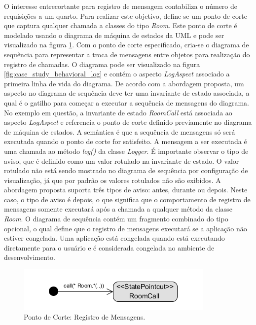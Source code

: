 O interesse entrecortante para registro de mensagem contabiliza o número de requisições a um quarto. Para realizar este objetivo, define-se um ponto
de corte que captura qualquer chamada a classes do tipo \textit{Room}. Este ponto de corte é modelado usando o diagrama de máquina de estados da UML e 
pode ser visualizado na figura \ref{fig:case_study_behavioral_pointcut_log}. Com o ponto de corte especificado, cria-se o diagrama de sequência para
representar a troca de mensagens entre objetos para realização do registro de chamadas. O diagrama pode ser visualizado 
na figura \ref{fig:case_study_behavioral_log} e contém o aspecto \textit{LogAspect} associado a primeira linha de vida do diagrama. De acordo com a
abordagem proposta, um aspecto no diagrama de sequência deve ter uma invariante de estado associada, a qual é o gatilho 
para começar a executar a sequência de mensagens do diagrama. No exemplo em questão, a invariante de estado \textit{RoomCall} está associada ao
aspecto \textit{LogAspect} e referencia o ponto de corte definido previamente no diagrama de máquina de estados. A semântica é que 
a sequência de mensagens só será executada quando o ponto de corte for satisfeito. A mensagem a ser executada
é uma chamada ao método \textit{log()} da classe \textit{Logger}. É importante observar o tipo de aviso, que é definido como um valor rotulado na
invariante de estado. O valor rotulado não está sendo mostrado no diagrama de sequência por configuração de visualização, já que por padrão os valores 
rotulados não são exibidos. A abordagem proposta suporta três tipos de aviso: antes, durante ou depois. Neste caso, o
tipo de aviso é depois, o que significa que o comportamento de registro de mensagens somente executará após a chamada a qualquer método da classe
\textit{Room}. O diagrama de sequência contém um fragmento combinado do tipo opcional, o qual define que o registro de mensagens executará se a
aplicação não estiver congelada. Uma aplicação está congelada quando está executando diretamente para o usuário e é considerada congelada no ambiente
de desenvolvimento.

  \begin{figure}
	\centering
	\includegraphics{img/case_study_behavioral_pointcut_log.png}
	\caption{Ponto de Corte: Registro de Mensagens.}\label{fig:case_study_behavioral_pointcut_log}
  \end{figure}
  
